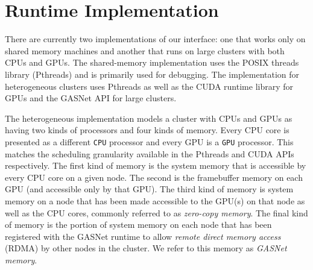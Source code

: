 
\section{Runtime Implementation}
\label{sec:impl}

There are currently two implementations of our interface:
one that works only on shared memory machines and another that
runs on large clusters with both CPUs and GPUs.  The shared-memory
implementation uses the POSIX threads library\cite{PTHREADS} (Pthreads)
and is primarily used for debugging.
The implementation for heterogeneous clusters uses Pthreads as 
well as the CUDA runtime library for GPUs\cite{CUDA} and the GASNet
API for large clusters\cite{GASNET07}.  

The heterogeneous implementation
models a cluster with CPUs and GPUs as having two kinds of processors 
and four kinds of memory.  Every CPU core is presented as a different {\tt CPU} processor
and every GPU is a {\tt GPU} processor.  This matches the scheduling granularity available
in the Pthreads and CUDA APIs respectively.  The first kind of memory is the 
system memory that is accessible by every CPU core on a given node.  The second is the 
framebuffer memory on each GPU (and accessible only by that GPU).  The third kind
of memory is system memory on a node that has been made accessible to the GPU(s) on
that node as well as the CPU cores, commonly referred to as {\em zero-copy memory}.
The final kind of memory is the portion of system memory on each node that has been registered with
the GASNet runtime to allow {\em remote direct memory access} (RDMA) by other nodes in the cluster.
We refer to this memory as {\em GASNet memory}.

